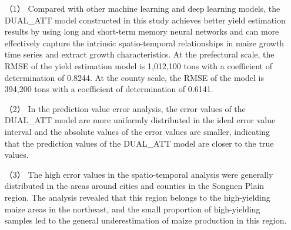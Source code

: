 \begin{itemize}
  \item [（1）] Compared with other machine learning and deep learning models, the DUAL\_ATT model constructed in this study achieves better yield estimation results by using long and short-term memory neural networks and can more effectively capture the intrinsic spatio-temporal relationships in maize growth time series and extract growth characteristics. At the prefectural scale, the RMSE of the yield estimation model is 1,012,100 tons with a coefficient of determination of 0.8244. At the county scale, the RMSE of the model is 394,200 tons with a coefficient of determination of 0.6141.
  \item [（2）] In the prediction value error analysis, the error values of the DUAL\_ATT model are more uniformly distributed in the ideal error value interval and the absolute values of the error values are smaller, indicating that the prediction values of the DUAL\_ATT model are closer to the true values.
  \item [（3）] The high error values in the spatio-temporal analysis were generally distributed in the areas around cities and counties in the Songnen Plain region. The analysis revealed that this region belongs to the high-yielding maize areas in the northeast, and the small proportion of high-yielding samples led to the general underestimation of maize production in this region.
\end{itemize}